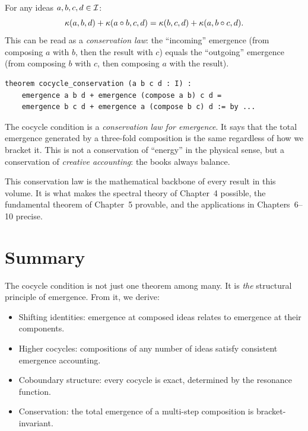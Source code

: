 \begin{theorem}
\label{thm:cocycle-conservation}
For any ideas $a, b, c, d \in \mathcal{I}$:
\[
  \kappa(a, b, d) + \kappa(a \circ b, c, d)
  = \kappa(b, c, d) + \kappa(a, b \circ c, d).
\]
This can be read as a \emph{conservation law}: the ``incoming'' emergence
(from composing $a$ with $b$, then the result with $c$) equals the ``outgoing''
emergence (from composing $b$ with $c$, then composing $a$ with the result).
\end{theorem}

\begin{lstlisting}[caption={Cocycle conservation (IDT\_v3\_Emergence.lean)}]
theorem cocycle_conservation (a b c d : I) :
    emergence a b d + emergence (compose a b) c d =
    emergence b c d + emergence a (compose b c) d := by ...
\end{lstlisting}

\begin{interpretation}
The cocycle condition is a \emph{conservation law for emergence}. It says that
the total emergence generated by a three-fold composition is the same regardless
of how we bracket it. This is not a conservation of ``energy'' in the physical
sense, but a conservation of \emph{creative accounting}: the books always balance.

This conservation law is the mathematical backbone of every result in this
volume. It is what makes the spectral theory of Chapter~4 possible, the
fundamental theorem of Chapter~5 provable, and the applications in
Chapters~6--10 precise.
\end{interpretation}


\section{Summary}

The cocycle condition is not just one theorem among many. It is \emph{the}
structural principle of emergence. From it, we derive:
\begin{itemize}
  \item Shifting identities: emergence at composed ideas relates to emergence
    at their components.
  \item Higher cocycles: compositions of any number of ideas satisfy consistent
    emergence accounting.
  \item Coboundary structure: every cocycle is exact, determined by the resonance
    function.
  \item Conservation: the total emergence of a multi-step composition is
    bracket-invariant.
\end{itemize}

